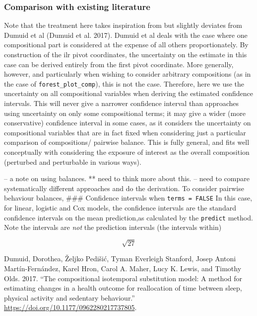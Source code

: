\documentclass[
]{article}
\begin{document}
\hypertarget{comparison-with-existing-literature}{%
\subsubsection{Comparison with existing
literature}\label{comparison-with-existing-literature}}

Note that the treatment here takes inspiration from but slightly
deviates from Dumuid et al (Dumuid et al. 2017). Dumuid et al deals with
the case where one compositional part is considered at the expense of
all others proportionately. By construction of the ilr pivot
coordinates, the uncertainty on the estimate in this case can be derived
entirely from the first pivot coordinate. More generally, however, and
particularly when wishing to consider arbitrary compositions (as in the
case of \texttt{forest\_plot\_comp}), this is not the case. Therefore,
here we use the uncertainty on all compositional variables when deriving
the estimated confidence intervals. This will never give a narrower
confidence interval than approaches using uncertainty on only some
compositional terms; it may give a wider (more conservative) confidence
interval in some cases, as it considers the uncertainty on compositional
variables that are in fact fixed when considering just a particular
comparison of compositions/ pairwise balance. This is fully general, and
fits well conceptually with considering the exposure of interest as the
overall composition (perturbed and perturbable in various ways).

-- a note on using balances. ** need to think more about this. -- need
to compare systematically different approaches and do the derivation. To
consider pairwise behaviour balances, \#\#\# Confidence intervals when
\texttt{terms\ =\ FALSE} In this case, for linear, logistic and Cox
models, the confidence intervals are the standard confidence intervals
on the mean prediction,as calculated by the \texttt{predict} method.
Note the intervals are \emph{not} the prediction intervals (the
intervals within)

\[
\sqrt{27}
\]

\hypertarget{refs}{}
\leavevmode\hypertarget{ref-Dumuid2017c}{}%
Dumuid, Dorothea, Željko Pedišić, Tyman Everleigh Stanford, Josep Antoni
Martín-Fernández, Karel Hron, Carol A. Maher, Lucy K. Lewis, and Timothy
Olds. 2017. ``The compositional isotemporal substitution model: A method
for estimating changes in a health outcome for reallocation of time
between sleep, physical activity and sedentary behaviour.''
\url{https://doi.org/10.1177/0962280217737805}.
\end{document}
